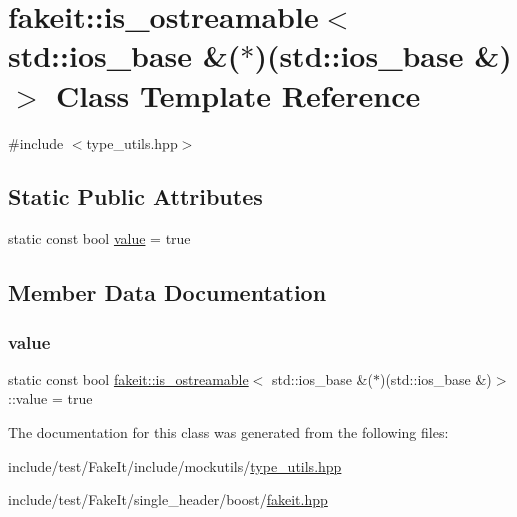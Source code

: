\hypertarget{classfakeit_1_1is__ostreamable_3_01std_1_1ios__base_01_6_07_5_08_07std_1_1ios__base_01_6_08_4}{}\section{fakeit\+::is\+\_\+ostreamable$<$ std\+::ios\+\_\+base \&($\ast$)(std\+::ios\+\_\+base \&)$>$ Class Template Reference}
\label{classfakeit_1_1is__ostreamable_3_01std_1_1ios__base_01_6_07_5_08_07std_1_1ios__base_01_6_08_4}


{\ttfamily \#include $<$type\+\_\+utils.\+hpp$>$}

\subsection*{Static Public Attributes}
\begin{DoxyCompactItemize}
\item 
static const bool \mbox{\hyperlink{classfakeit_1_1is__ostreamable_3_01std_1_1ios__base_01_6_07_5_08_07std_1_1ios__base_01_6_08_4_a5bd7ff93b7bc0a3a994c915b2f471077}{value}} = true
\end{DoxyCompactItemize}


\subsection{Member Data Documentation}
\mbox{\label{classfakeit_1_1is__ostreamable_3_01std_1_1ios__base_01_6_07_5_08_07std_1_1ios__base_01_6_08_4_a5bd7ff93b7bc0a3a994c915b2f471077}} 
\subsubsection{\texorpdfstring{value}{value}}
{\footnotesize\ttfamily static const bool \mbox{\hyperlink{classfakeit_1_1is__ostreamable}{fakeit\+::is\+\_\+ostreamable}}$<$ std\+::ios\+\_\+base \&($\ast$)(std\+::ios\+\_\+base \&)$>$\+::value = true\hspace{0.3cm}{\ttfamily [static]}}



The documentation for this class was generated from the following files\+:\begin{DoxyCompactItemize}
\item 
include/test/\+Fake\+It/include/mockutils/\mbox{\hyperlink{type__utils_8hpp}{type\+\_\+utils.\+hpp}}\item 
include/test/\+Fake\+It/single\+\_\+header/boost/\mbox{\hyperlink{single__header_2boost_2fakeit_8hpp}{fakeit.\+hpp}}\end{DoxyCompactItemize}
